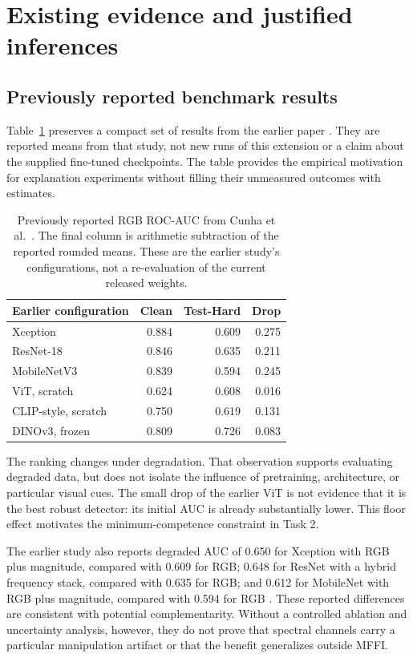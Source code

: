 \documentclass[conference,10pt,letterpaper]{IEEEtran}
\begin{document}
\section{Existing evidence and justified inferences}
\subsection{Previously reported benchmark results}
Table~\ref{tab:legacy} preserves a compact set of results from the earlier paper \cite{cunha2026}. They are reported means from that study, not new runs of this extension or a claim about the supplied fine-tuned checkpoints. The table provides the empirical motivation for explanation experiments without filling their unmeasured outcomes with estimates.

\begin{table}[t]
\caption{Previously reported RGB ROC-AUC from Cunha et al.~\cite{cunha2026}. The final column is arithmetic subtraction of the reported rounded means. These are the earlier study's configurations, not a re-evaluation of the current released weights.}
\label{tab:legacy}
\centering
\begin{tabular}{lrrr}
\toprule
Earlier configuration & Clean & Test-Hard & Drop\\
\midrule
Xception & 0.884 & 0.609 & 0.275\\
ResNet-18 & 0.846 & 0.635 & 0.211\\
MobileNetV3 & 0.839 & 0.594 & 0.245\\
ViT, scratch & 0.624 & 0.608 & 0.016\\
CLIP-style, scratch & 0.750 & 0.619 & 0.131\\
DINOv3, frozen & 0.809 & 0.726 & 0.083\\
\bottomrule
\end{tabular}
\end{table}

The ranking changes under degradation. That observation supports evaluating degraded data, but does not isolate the influence of pretraining, architecture, or particular visual cues. The small drop of the earlier ViT is not evidence that it is the best robust detector: its initial AUC is already substantially lower. This floor effect motivates the minimum-competence constraint in Task 2.

The earlier study also reports degraded AUC of 0.650 for Xception with RGB plus magnitude, compared with 0.609 for RGB; 0.648 for ResNet with a hybrid frequency stack, compared with 0.635 for RGB; and 0.612 for MobileNet with RGB plus magnitude, compared with 0.594 for RGB \cite{cunha2026}. These reported differences are consistent with potential complementarity. Without a controlled ablation and uncertainty analysis, however, they do not prove that spectral channels carry a particular manipulation artifact or that the benefit generalizes outside MFFI.
\end{document}
